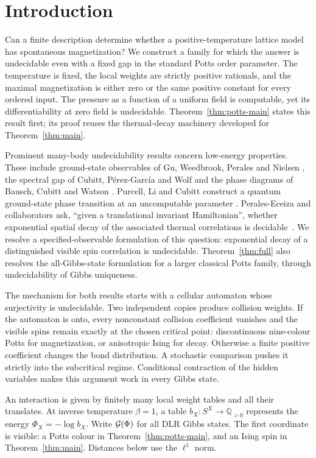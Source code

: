 \section{Introduction}\label{sec:intro}
Can a finite description determine whether a positive-temperature lattice model has spontaneous magnetization? We construct a family for which the answer is undecidable even with a fixed gap in the standard Potts order parameter. The temperature is fixed, the local weights are strictly positive rationals, and the maximal magnetization is either zero or the same positive constant for every ordered input. The pressure as a function of a uniform field is computable, yet its differentiability at zero field is undecidable. Theorem~\ref{thm:potts-main} states this result first; its proof reuses the thermal-decay machinery developed for Theorem~\ref{thm:main}.

Prominent many-body undecidability results concern low-energy properties. These include ground-state observables of Gu, Weedbrook, Perales and Nielsen \cite[Section III]{GWPN}, the spectral gap of Cubitt, P\'erez-Garc\'ia and Wolf \cite{CPGW} and the phase diagrams of Bausch, Cubitt and Watson \cite[Section 2]{BCW}. Purcell, Li and Cubitt construct a quantum ground-state phase transition at an uncomputable parameter \cite[Theorem 1]{PLC}. Perales-Eceiza and collaborators ask, \textquotedblleft given a translational invariant Hamiltonian\textquotedblright, whether exponential spatial decay of the associated thermal correlations is decidable\ \cite[Section 5.1.4, arXiv v2 numbering]{review}.
We resolve a specified-observable formulation of this question: exponential decay of a distinguished visible spin correlation is undecidable. Theorem~\ref{thm:full} also resolves the all-Gibbs-state formulation for a larger classical Potts family, through undecidability of Gibbs uniqueness.

The mechanism for both results starts with a cellular automaton whose surjectivity is undecidable. Two independent copies produce collision weights. If the automaton is onto, every nonconstant collision coefficient vanishes and the visible spins remain exactly at the chosen critical point: discontinuous nine-colour Potts for magnetization, or anisotropic Ising for decay. Otherwise a finite positive coefficient changes the bond distribution. A stochastic comparison pushes it strictly into the subcritical regime. Conditional contraction of the hidden variables makes this argument work in every Gibbs state.

An interaction is given by finitely many local weight tables and all their translates. At inverse temperature $\beta=1$, a table $b_X:S^X\to\mathbb Q_{>0}$ represents the energy $\Phi_X=-\log b_X$. Write $\mathcal G(\Phi)$ for all DLR Gibbs states. The first coordinate is visible: a Potts colour in Theorem~\ref{thm:potts-main}, and an Ising spin in Theorem~\ref{thm:main}. Distances below use the $\ell^1$ norm.

